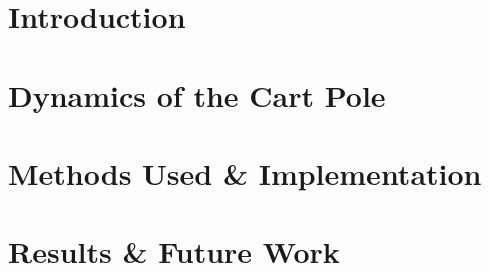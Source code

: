 \documentclass[12pt]{article}
\begin{document}
\maketitle

\section{Introduction}


\section{Dynamics of the Cart Pole}


\section{Methods Used \& Implementation}


\section{Results \& Future Work}
\end{document}

